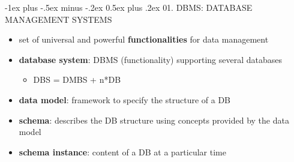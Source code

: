 \documentclass[10pt, landscape]{article}
\makeatletter
\renewcommand{\section}{\@startsection{section}{1}{0mm}%
  {-1ex plus -.5ex minus -.2ex}%
  {0.5ex plus .2ex}%
{\normalfont\large\bfseries}}
\makeatother
\begin{document}
\raggedright
\footnotesize
\begin{multicols}{3}

  \setlength{\columnseprule}{0.25pt}
  \setlength{\premulticols}{1pt}
  \setlength{\postmulticols}{1pt}
  \setlength{\multicolsep}{1pt}
  \setlength{\columnsep}{2pt}

  \begin{center}
  \end{center}

  \section{01. DBMS: DATABASE MANAGEMENT SYSTEMS}
  \begin{itemize}
    \item set of universal and powerful \textbf{functionalities}  for data management
    \item \textbf{database system}: DBMS (functionality) supporting several databases
      \begin{itemize}
        \item DBS = DMBS + n*DB
      \end{itemize}
    \item \textbf{data model}: framework to specify the structure of a DB
    \item \textbf{schema}: describes the DB structure using concepts provided by the data model
    \item \textbf{schema instance}: content of a DB at a particular time
  \end{itemize}


\end{multicols}
\end{document}
